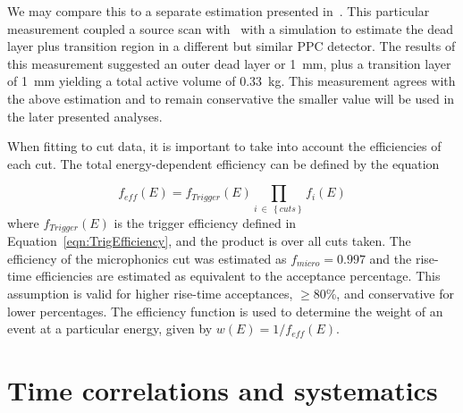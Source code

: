 	We may compare this to a separate estimation presented in~\cite{Aalseth:2010aa}.  This particular measurement coupled a source scan with \amtwofourone~with a simulation to estimate the dead layer plus transition region in a different but similar PPC detector.  The results of this measurement suggested an outer dead layer or 1~mm, plus a transition layer of 1~mm yielding a total active volume of 0.33~kg.  This measurement agrees with the above estimation and to remain conservative the smaller value will be used in the later presented analyses.
	
	When fitting to cut data, it is important to take into account the efficiencies of each cut.  The total energy-dependent efficiency can be defined by the equation 
	
		\begin{equation}
		f_{eff}(E) = f_{Trigger}(E) \prod_{i~\in~\left\{cuts\right\}} f_{i}(E)		
		\label{eqn:EfficiencyEquation}
		\end{equation}
where $f_{Trigger}(E)$ is the trigger efficiency defined in Equation~\ref{eqn:TrigEfficiency}, and the product is over all cuts taken.  The efficiency of the microphonics cut was estimated as $f_{micro} = 0.997$ and the rise-time efficiencies are estimated as equivalent to the acceptance percentage.  This assumption is valid for higher rise-time acceptances, $\ge80$\%, and conservative for lower percentages.  The efficiency function is used to determine the weight of an event at a particular energy, given by $w(E) = 1/f_{eff}(E)$.

	\section{Time correlations and systematics}
	\label{sec:BeGeTimeCorrelations}

